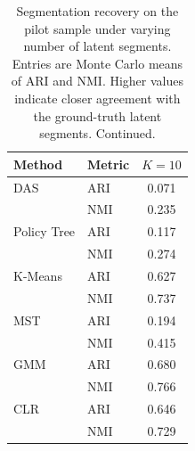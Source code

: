 \begin{table}[htbp]
\centering
\caption{Segmentation recovery on the pilot sample under varying number of latent segments. Entries are Monte Carlo means of ARI and NMI. Higher values indicate closer agreement with the ground-truth latent segments. Continued.}
\label{tab:app-ari-nmi-varying-K-cont}
\begin{tabular}{llc}
\toprule
Method & Metric & $K=10$ \\
\midrule
DAS & ARI & 0.071 \\
 & NMI & 0.235 \\
\addlinespace
Policy Tree & ARI & 0.117 \\
 & NMI & 0.274 \\
\addlinespace
K-Means & ARI & 0.627 \\
 & NMI & 0.737 \\
\addlinespace
MST & ARI & 0.194 \\
 & NMI & 0.415 \\
\addlinespace
GMM & ARI & 0.680 \\
 & NMI & 0.766 \\
\addlinespace
CLR & ARI & 0.646 \\
 & NMI & 0.729 \\
\bottomrule
\end{tabular}
\end{table}
